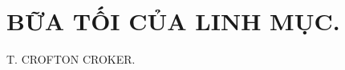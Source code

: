 \section{BỮA TỐI CỦA LINH MỤC.}

\begin{large}
  \begin{center}
    \uppercase{T. CROFTON CROKER.}
  \end{center}
\end{large}


